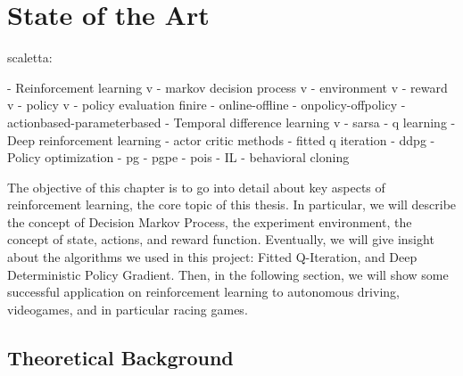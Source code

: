 \chapter{State of the Art}
\label{State of the Art}
\thispagestyle{empty}

scaletta:



- Reinforcement learning v
	- markov decision process v
	- environment v
	- reward v
	- policy v
	- policy evaluation finire
	- online-offline
	- onpolicy-offpolicy
	- actionbased-parameterbased
- Temporal difference learning v
	- sarsa
	- q learning
- Deep reinforcement learning
	- actor critic methods
	- fitted q iteration
	- ddpg
- Policy optimization
	- pg
    - pgpe
	- pois
- IL
	- behavioral cloning


The objective of this chapter is to go into detail about key aspects of reinforcement learning, the core topic of this thesis. In particular, we will describe the concept of Decision Markov Process, the experiment environment, the concept of state, actions, and reward function. Eventually, we will give insight about the algorithms we used in this project: Fitted Q-Iteration, and Deep Deterministic Policy Gradient. 
Then, in the following section, we will show some successful application on reinforcement learning to autonomous driving, videogames, and in particular racing games.


\section{Theoretical Background}

